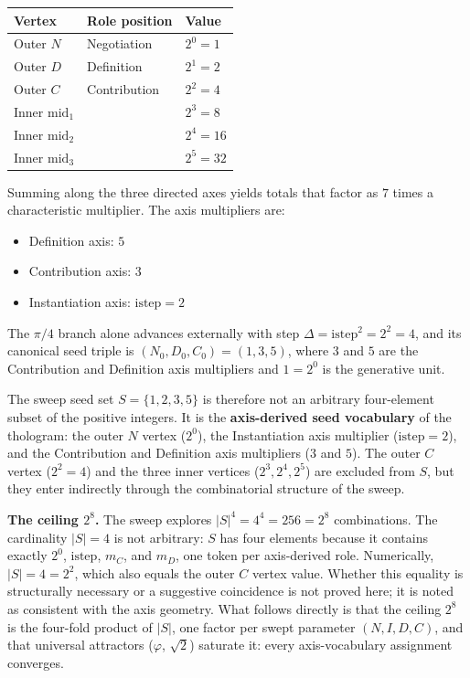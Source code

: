 \documentclass[
  11pt,
  letterpaper,
]{article}
\providecommand{\tightlist}{%
  \setlength{\itemsep}{0pt}\setlength{\parskip}{0pt}}
\begin{document}
\begin{longtable}[]{@{}lll@{}}
\toprule\noalign{}
Vertex & Role position & Value \\
\midrule\noalign{}
\endhead
\bottomrule\noalign{}
\endlastfoot
Outer \(N\) & Negotiation & \(2^0 = 1\) \\
Outer \(D\) & Definition & \(2^1 = 2\) \\
Outer \(C\) & Contribution & \(2^2 = 4\) \\
Inner \(\mathrm{mid}_1\) & & \(2^3 = 8\) \\
Inner \(\mathrm{mid}_2\) & & \(2^4 = 16\) \\
Inner \(\mathrm{mid}_3\) & & \(2^5 = 32\) \\
\end{longtable}

Summing along the three directed axes yields totals that factor as \(7\)
times a characteristic multiplier. The axis multipliers are:

\begin{itemize}
\tightlist
\item
  Definition axis: \(5\)
\item
  Contribution axis: \(3\)
\item
  Instantiation axis: \(\mathrm{istep} = 2\)
\end{itemize}

The \(\pi/4\) branch alone advances externally with step
\(\Delta = \mathrm{istep}^2 = 2^2 = 4\), and its canonical seed triple
is \((N_0, D_0, C_0) = (1, 3, 5)\), where \(3\) and \(5\) are the
Contribution and Definition axis multipliers and \(1 = 2^0\) is the
generative unit.

The sweep seed set \(S = \{1, 2, 3, 5\}\) is therefore not an arbitrary
four-element subset of the positive integers. It is the
\textbf{axis-derived seed vocabulary} of the thologram: the outer \(N\)
vertex (\(2^0\)), the Instantiation axis multiplier
(\(\mathrm{istep} = 2\)), and the Contribution and Definition axis
multipliers (\(3\) and \(5\)). The outer \(C\) vertex (\(2^2 = 4\)) and
the three inner vertices (\(2^3, 2^4, 2^5\)) are excluded from \(S\),
but they enter indirectly through the combinatorial structure of the
sweep.

\textbf{The ceiling \(2^8\).} The sweep explores
\(|S|^4 = 4^4 = 256 = 2^8\) combinations. The cardinality \(|S| = 4\) is
not arbitrary: \(S\) has four elements because it contains exactly
\(2^0\), \(\mathrm{istep}\), \(m_C\), and \(m_D\), one token per
axis-derived role. Numerically, \(|S| = 4 = 2^2\), which also equals the
outer \(C\) vertex value. Whether this equality is structurally
necessary or a suggestive coincidence is not proved here; it is noted as
consistent with the axis geometry. What follows directly is that the
ceiling \(2^8\) is the four-fold product of \(|S|\), one factor per
swept parameter \((N, I, D, C)\), and that universal attractors
(\(\varphi\), \(\sqrt{2}\)) saturate it: every axis-vocabulary
assignment converges.
\end{document}
